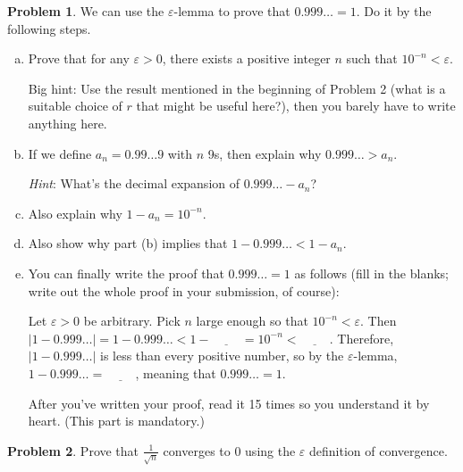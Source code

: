 \documentclass[11pt,oneside]{amsart}
\theoremstyle{definition}
\newtheorem{problem}{Problem}
\theoremstyle{plain}
\newcommand{\eps}{\varepsilon}
\begin{document}
    \begin{problem}
        We can use the $\eps$-lemma to prove that $0.999\ldots=1$. Do it by the following steps.
        \begin{enumerate}[(a)]
            \item Prove that for any $\eps>0$, there exists a positive integer $n$ such that $10^{-n}<\eps$.
            
            Big hint: Use the result mentioned in the beginning of Problem 2 (what is a suitable choice of $r$ that might be useful here?), then you barely have to write anything here.
            \item If we define $a_n=0.99\dots 9$ with $n$ 9s, then explain why $0.999\ldots >a_n$.
            
            \emph{Hint}: What's the decimal expansion of $0.999\ldots-a_n$?
            \item Also explain why $1-a_n=10^{-n}$.
            \item Also show why part (b) implies that $1-0.999\ldots<1-a_n$.
            \item You can finally write the proof that $0.999\ldots=1$ as follows (fill in the blanks; write out the whole proof in your submission, of course):
            
            Let $\eps>0$ be arbitrary. Pick $n$ large enough so that $10^{-n}<\eps$. Then $|1-0.999\ldots|=1-0.999\ldots<1-\underline{\hspace{1cm}}=10^{-n}<\underline{\hspace{1cm}}$. Therefore, $|1-0.999\ldots|$ is less than every positive number, so by the $\eps$-lemma, $1-0.999\ldots=\underline{\hspace{1cm}}$, meaning that $0.999\ldots=1$.

            After you've written your proof, read it 15 times so you understand it by heart. (This part is mandatory.)
        \end{enumerate}
    \end{problem}

    \begin{problem}
        Prove that $\frac 1{\sqrt n}$ converges to 0 using the $\eps$ definition of convergence.
    \end{problem}
\end{document}
